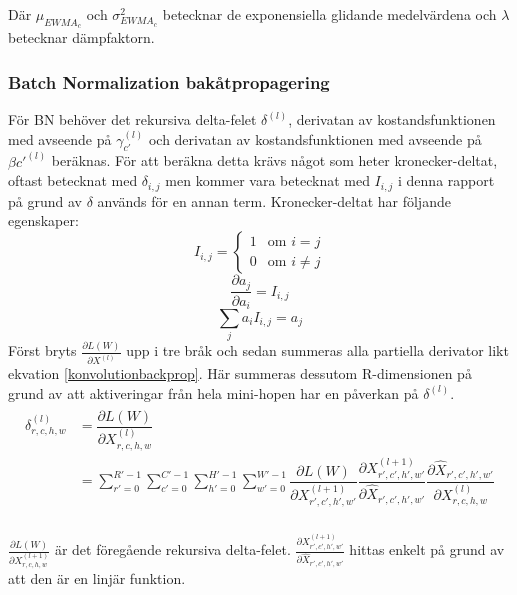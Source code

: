 \documentclass[a4paper,11pt,twoside]{article}
\newcommand*{\pd}[2]{\ensuremath{\dfrac{\partial #1}{\partial #2}}}
\newcommand*{\inpd}[2]{\ensuremath{\frac{\partial #1}{\partial #2}}}
\begin{document}
Där $\mu_{EWMA_c}$ och $\sigma^2_{EWMA_c}$ betecknar de exponensiella glidande medelvärdena och $\lambda$ betecknar dämpfaktorn.


\subsubsection{Batch Normalization bakåtpropagering}
För BN behöver det rekursiva delta-felet $\delta^{(l)}$, derivatan av kostandsfunktionen med avseende på $\gamma_{c'}^{(l)}$ och derivatan av kostandsfunktionen med avseende på $\beta{c'}^{(l)}$ beräknas. För att beräkna detta krävs något som heter kronecker-deltat, oftast betecknat med $\delta_{i,j}$ men kommer vara betecknat med $I_{i,j}$ i denna rapport på grund av $\delta$ används för en annan term. Kronecker-deltat har följande egenskaper: \cite{webBN1} \cite{webBN2}
\begin{equation}\label{kroneckerdelta}
I_{i,j} = \begin{cases} 1 & \mbox{om } i = j \\ 0 & \mbox{om } i \neq j  \end{cases}
\end{equation}
\begin{equation}\label{kroneckerdeltaDERIVATIVE}
\pd{a_{j}}{a_i} = I_{i,j}
\end{equation}
\begin{equation}\label{kroneckerdeltaSUM}
\sum_j  a_i  I_{i,j} = a_j
\end{equation}
Först bryts $\inpd{L(W)}{X^{(l)}}$ upp i tre bråk och sedan summeras alla partiella derivator likt ekvation \eqref{konvolutionbackprop}. \cite{webBN1} \cite{webBN2} Här summeras dessutom R-dimensionen på grund av att aktiveringar från hela mini-hopen har en påverkan på $\delta^{(l)}$.
\begin{align}\label{BN_delta_error}
\begin{split}
	\delta^{(l)}_{r,c,h,w}
		& = \pd{L(W)}{X^{(l)}_{r,c,h,w}} \\
		& = \sum^{R'-1}_{r'=0} \sum^{C'-1}_{c'=0} \sum^{H'-1}_{h'=0} \sum^{W'-1}_{w'=0} \pd{L(W)}{X^{(l+1)}_{r',c',h',w'}} \pd{X^{(l+1)}_{r',c',h',w'}}{\hat{X}_{r',c',h',w'}} \pd{\hat{X}_{r',c',h',w'}}{{X}^{(l)}_{r,c,h,w}}\\
\end{split}
\end{align}

$\inpd{L(W)}{X^{(l+1)}_{r,c,h,w}}$ är det föregående rekursiva delta-felet. $\inpd{X^{(l+1)}_{r',c',h',w'}}{\hat{X}_{r',c',h',w'}}$ hittas enkelt på grund av att den är en linjär funktion. \cite{webBN1} \cite{webBN2}
\end{document}
